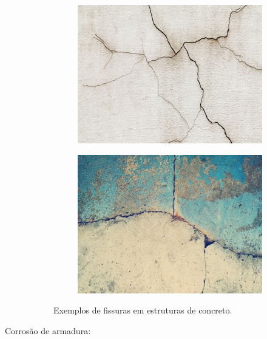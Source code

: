 \begin{description}
    \begin{figure}[htb]
    \centering
        \begin{subfigure}{.5\textwidth}
          \centering
          \includegraphics[width=.8\linewidth]{images/mapa_da_obra_img_fissura.jpg}
          \label{fig:fissura01}
        \end{subfigure}%
        \begin{subfigure}{.5\textwidth}
          \centering
          \includegraphics[width=.8\linewidth]{images/tudo_construcao_fissura02.jpg}
          \label{fig:fissura02}
        \end{subfigure}
    
    \caption{Exemplos de fissuras em estruturas de concreto.}
    \label{fig:fissuras}
    \end{figure}

    
    \item[Corrosão de armadura:]
    

\end{description}
